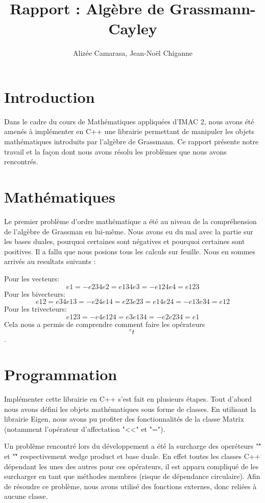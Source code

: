 \documentclass[12pt]{article}
\begin{document}
\pagestyle{headings}

\title{Rapport : Algèbre de Grassmann-Cayley}
\author{Alizée Camarasa, Jean-Noël Chiganne}
\maketitle
\newpage
\tableofcontents

\newpage
\section{Introduction}
Dans le cadre du cours de Mathématiques appliquées d'IMAC 2, nous avons été amenés à implémenter en C++ une librairie permettant de manipuler les objets mathématiques introduits par l'algèbre de Grassmann.
Ce rapport présente notre travail et la façon dont nous avons résolu les problèmes que nous avons rencontrés.


\newpage

\section{Mathématiques}
Le premier problème d’ordre mathématique a été au niveau de la compréhension de l’algèbre de Grassman en lui-même. Nous avons eu du mal avec la partie sur les bases duales, pourquoi certaines sont négatives et pourquoi certaines sont positives. Il a fallu que nous posions tous les calculs sur feuille. Nous en sommes arrivés au resultats suivants : 

Pour les vecteurs: 
$$e1=-e234 e2=e134 e3=-e124 e4=e123$$ 
Pour les bivecteurs:
$$e12=e34 e13=-e24 e14=e23 e23=e14 e24=-e13 e34=e12$$
Pour les trivecteurs: 
$$e123=-e4 e124=e3 e134=-e2 e234=e1$$
Cela nous a permis de comprendre comment faire les opérateurs $$^ et ~$$.


\section{Programmation}
Implémenter cette librairie en C++ s'est fait en plusieurs étapes. Tout d'abord nous avons défini les objets mathématiques sous forme de classes.
En utilisant la librairie Eigen, nous avons pu profiter des fonctionnalités de la classe Matrix (notamment l'opérateur d'affectation "<<" et "=").

Un problème rencontré lors du développement a été la surcharge des operéteurs "\^" et "\~" respectivement wedge product et base duale.
En effet toutes les classes C++ dépendant les unes des autres pour ces opérateurs, il est apparu compliqué de les surcharger en tant que méthodes membres (risque de dépendance circulaire).
Afin de résoudre ce problème, nous avons utilisé des fonctions externes, donc reliées à aucune classe.
\end{document}
